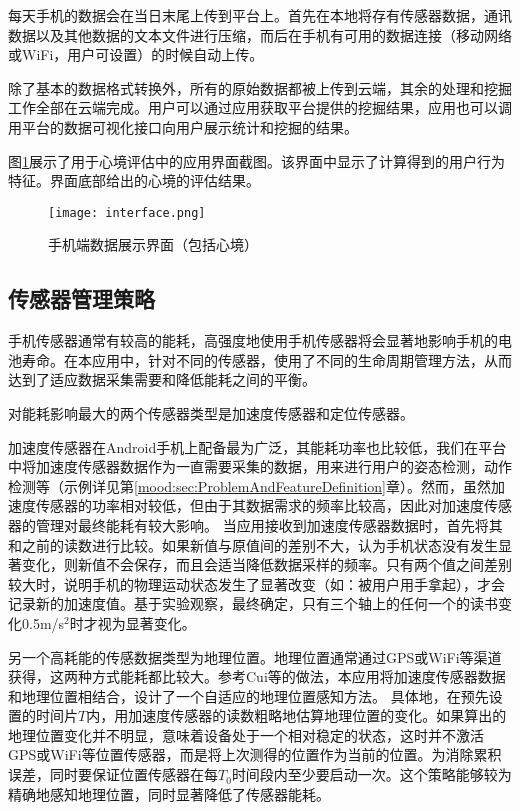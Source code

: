每天手机的数据会在当日末尾上传到平台上。首先在本地将存有传感器数据，通讯数据以及其他数据的文本文件进行压缩，而后在手机有可用的数据连接（移动网络或WiFi，用户可设置）的时候自动上传。

除了基本的数据格式转换外，所有的原始数据都被上传到云端，其余的处理和挖掘工作全部在云端完成。用户可以通过应用获取平台提供的挖掘结果，应用也可以调用平台的数据可视化接口向用户展示统计和挖掘的结果。

图\ref{system:fig:interface}展示了用于心境评估中的应用界面截图。该界面中显示了计算得到的用户行为特征。界面底部给出的心境的评估结果。

\begin{figure}[htbp]
  \centering
    \texttt{[image: interface.png]}
  \caption{手机端数据展示界面（包括心境）}
  \label{system:fig:interface}
\end{figure}

\subsection{传感器管理策略}
\label{system:sec:SensorManagementStrategy}

手机传感器通常有较高的能耗，高强度地使用手机传感器将会显著地影响手机的电池寿命。在本应用中，针对不同的传感器，使用了不同的生命周期管理方法，从而达到了适应数据采集需要和降低能耗之间的平衡。

对能耗影响最大的两个传感器类型是加速度传感器和定位传感器。

加速度传感器在Android手机上配备最为广泛，其能耗功率也比较低，我们在平台中将加速度传感器数据作为一直需要采集的数据，用来进行用户的姿态检测，动作检测等（示例详见第\ref{mood:sec:ProblemAndFeatureDefinition}章）。然而，虽然加速度传感器的功率相对较低，但由于其数据需求的频率比较高，因此对加速度传感器的管理对最终能耗有较大影响。
% 
当应用接收到加速度传感器数据时，首先将其和之前的读数进行比较。如果新值与原值间的差别不大，认为手机状态没有发生显著变化，则新值不会保存，而且会适当降低数据采样的频率。只有两个值之间差别较大时，说明手机的物理运动状态发生了显著改变（如：被用户用手拿起），才会记录新的加速度值。基于实验观察，最终确定，只有三个轴上的任何一个的读书变化0.5m/s$^2$时才视为显著变化。
  
另一个高耗能的传感数据类型为地理位置。地理位置通常通过GPS或WiFi等渠道获得，这两种方式能耗都比较大。参考Cui等\cite{jianc}的做法，本应用将加速度传感器数据和地理位置相结合，设计了一个自适应的地理位置感知方法。
具体地，在预先设置的时间片$T$内，用加速度传感器的读数粗略地估算地理位置的变化。如果算出的地理位置变化并不明显，意味着设备处于一个相对稳定的状态，这时并不激活GPS或WiFi等位置传感器，而是将上次测得的位置作为当前的位置。为消除累积误差，同时要保证位置传感器在每$T_0$时间段内至少要启动一次。这个策略能够较为精确地感知地理位置，同时显著降低了传感器能耗。


